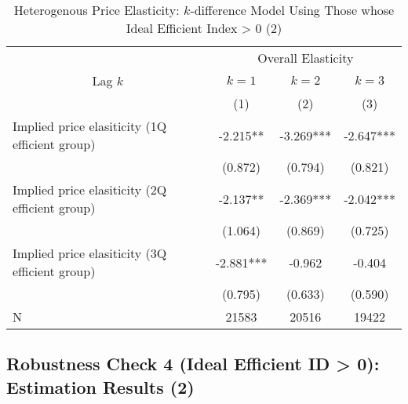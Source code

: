 \documentclass[ review  , 3p ]{elsarticle}
\begin{document}
  \begin{table}

  \caption{\label{tab:kableSubsetHeterokDiffElasticitySlide2}Heterogenous Price Elasticity: $k$-difference Model Using Those whose Ideal Efficient Index > 0 (2)}
  \centering
  \fontsize{8}{10}\selectfont
  \begin{tabular}[t]{lccc}
  \toprule
  \multicolumn{1}{c}{ } & \multicolumn{3}{c}{Overall Elasticity} \\
  \cmidrule(l{3pt}r{3pt}){2-4}
  \multicolumn{1}{c}{Lag $k$} & \multicolumn{1}{c}{$k = 1$} & \multicolumn{1}{c}{$k = 2$} & \multicolumn{1}{c}{$k = 3$} \\
  \cmidrule(l{3pt}r{3pt}){1-1} \cmidrule(l{3pt}r{3pt}){2-2} \cmidrule(l{3pt}r{3pt}){3-3} \cmidrule(l{3pt}r{3pt}){4-4}
   & (1) & (2) & (3)\\
  \midrule
  Implied price elasiticity (1Q efficient group) & -2.215** & -3.269*** & -2.647***\\
   & (0.872) & (0.794) & (0.821)\\
  Implied price elasiticity (2Q efficient group) & -2.137** & -2.369*** & -2.042***\\
   & (1.064) & (0.869) & (0.725)\\
  Implied price elasiticity (3Q efficient group) & -2.881*** & -0.962 & -0.404\\
   & (0.795) & (0.633) & (0.590)\\
  N & 21583 & 20516 & 19422\\
  \bottomrule
  \end{tabular}
  \end{table}

  \hypertarget{robustness-check-4-ideal-efficient-id-0-estimation-results-2}{%
  \subsection{Robustness Check 4 (Ideal Efficient ID \textgreater{} 0): Estimation Results (2)}\label{robustness-check-4-ideal-efficient-id-0-estimation-results-2}}
\end{document}
